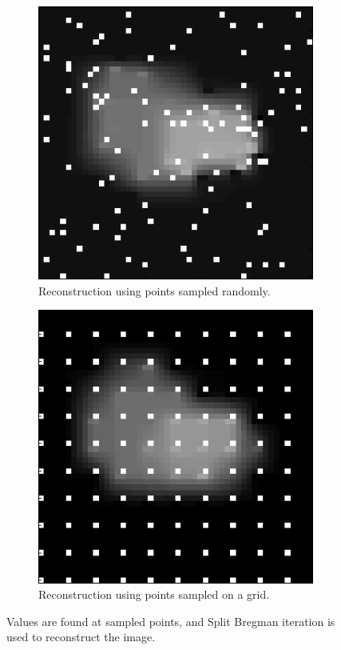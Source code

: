 \documentclass[english]{article}\usepackage[]{graphicx}\usepackage[]{color}
\begin{document}
\begin{figure}
\centering
\begin{subfigure}{.45\textwidth}
  \centering
    \includegraphics[width=1\linewidth]{figures/randompointreconstruction}
  \caption{Reconstruction using points sampled randomly.}
  \label{fig:randrec}
\end{subfigure}%
\hspace{10pt}
\begin{subfigure}{.45\textwidth}
  \centering
    \includegraphics[width=1\linewidth]{figures/gridpointreconstruction}
  \caption{Reconstruction using points sampled on a grid.}
  \label{fig:gridrec}
\end{subfigure}
\caption{Values are found at sampled points, and Split Bregman iteration is used to reconstruct the image.}
\label{fig:samplerec}
\end{figure}
\end{document}
